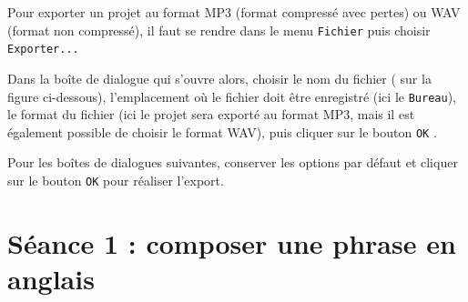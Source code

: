 Pour exporter un projet au format MP3 (format compressé avec pertes) ou WAV (format non compressé), il faut se rendre dans le menu \texttt{Fichier} puis choisir \texttt{Exporter...}

\vspace{6pt}

Dans la boîte de dialogue qui s'ouvre alors, choisir le nom du fichier ( sur la figure ci-dessous), l'emplacement où le fichier doit être enregistré  (ici le \texttt{Bureau}), le format du fichier  (ici le projet sera exporté au format MP3, mais il est également possible de choisir le format WAV), puis cliquer sur le bouton \texttt{OK} .       


Pour les boîtes de dialogues suivantes, conserver les options par défaut et cliquer sur le bouton \texttt{OK} pour réaliser l'export. 







%
%
%
%

\newpage
\phantom{rien}
\newpage

\section{Séance 1 : composer une phrase en anglais}\label{ficheSon5e1}

